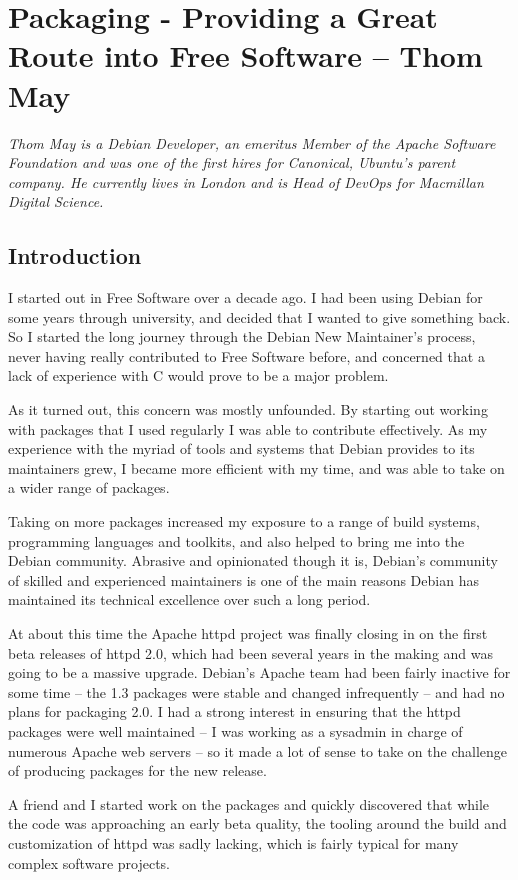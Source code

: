 \chapter{Packaging - Providing a Great Route into Free Software -- Thom May}

\textit{Thom May is a Debian Developer, an emeritus Member of the Apache
Software Foundation and was one of the first hires for Canonical, Ubuntu's
parent company. He currently lives in London and is Head of DevOps for Macmillan
Digital Science.}

\section*{Introduction}
I started out in Free Software over a decade ago. I had been using Debian for
some years through university, and decided that I wanted to give something back.
So I started the long journey through the Debian New Maintainer's process, never
having really contributed to Free Software before, and concerned that a lack of
experience with C would prove to be a major problem.

As it turned out, this concern was mostly unfounded. By starting out working
with packages that I used regularly I was able to contribute effectively. As my
experience with the myriad of tools and systems that Debian provides to its
maintainers grew, I became more efficient with my time, and was able to take on
a wider range of packages. 

Taking on more packages increased my exposure to a range of build systems,
programming languages and toolkits, and also helped to bring me into the Debian
community. Abrasive and opinionated though it is, Debian's community of skilled
and experienced maintainers is one of the main reasons Debian has maintained its
technical excellence over such a long period.

At about this time the Apache httpd project was finally closing in on the first
beta releases of httpd 2.0, which had been several years in the making and was
going to be a massive upgrade. Debian's Apache team had been fairly inactive for
some time -- the 1.3 packages were stable and changed infrequently -- and had no
plans for packaging 2.0. 
I had a strong interest in ensuring that the httpd packages were well maintained
-- I was working as a sysadmin in charge of numerous Apache web servers -- so it
made a lot of sense to take on the challenge of producing packages for the new
release. 

A friend and I started work on the packages and quickly discovered that while
the code was approaching an early beta quality, the tooling around the build and
customization of httpd was sadly lacking, which is fairly typical for many
complex software projects. 

